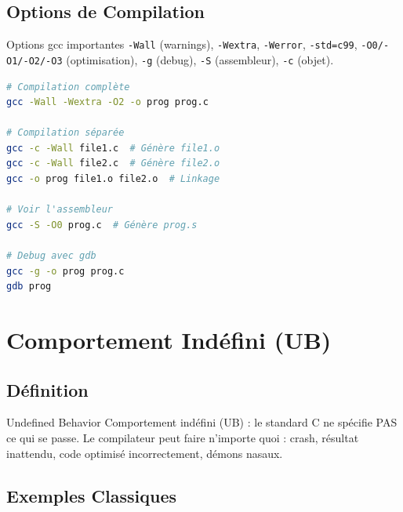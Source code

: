 \documentclass[10pt,a4paper]{article}
\begin{document}
\subsection{Options de Compilation}

\begin{techbox}{Options gcc importantes}
\texttt{-Wall} (warnings), \texttt{-Wextra}, \texttt{-Werror}, \texttt{-std=c99}, \texttt{-O0/-O1/-O2/-O3} (optimisation), \texttt{-g} (debug), \texttt{-S} (assembleur), \texttt{-c} (objet).
\end{techbox}

\begin{lstlisting}[language=bash,caption={Commandes gcc}]
# Compilation complète
gcc -Wall -Wextra -O2 -o prog prog.c

# Compilation séparée
gcc -c -Wall file1.c  # Génère file1.o
gcc -c -Wall file2.c  # Génère file2.o
gcc -o prog file1.o file2.o  # Linkage

# Voir l'assembleur
gcc -S -O0 prog.c  # Génère prog.s

# Debug avec gdb
gcc -g -o prog prog.c
gdb prog
\end{lstlisting}

\section{Comportement Indéfini (UB)}

\subsection{Définition}

\begin{warningbox}{Undefined Behavior}
Comportement indéfini (UB) : le standard C ne spécifie PAS ce qui se passe. Le compilateur peut faire n'importe quoi : crash, résultat inattendu, code optimisé incorrectement, démons nasaux.
\end{warningbox}

\subsection{Exemples Classiques}
\end{document}
